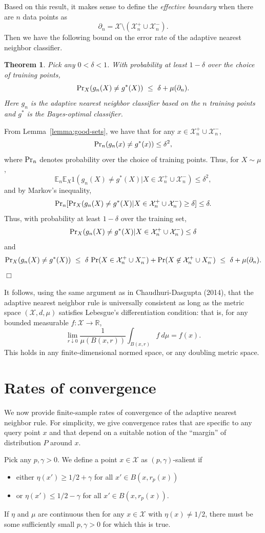 \documentclass{article}
\def\R{{\mathbb{R}}}
\def\pr{{\rm Pr}}
\def\E{{\mathbb E}}
\def\X{{\mathcal X}}
\newtheorem{thm}{Theorem}
\newenvironment{proof}{\noindent {\sc Proof:}}{$\Box$ \medskip}
\begin{document}
Based on this result, it makes sense to define the {\it effective boundary} when there are $n$ data points as 
$$ \partial_n = \X \setminus (\X^+_n \cup \X^-_n) .$$
Then we have the following bound on the error rate of the adaptive nearest neighbor classifier.
\begin{thm}
Pick any $0 < \delta < 1$. With probability at least $1-\delta$ over the choice of training points,
$$ \pr_{X}(g_n(X) \neq g^*(X)) \ \leq \ \delta + \mu(\partial_n) .$$
Here $g_n$ is the adaptive nearest neighbor classifier based on the $n$ training points and $g^*$ is the Bayes-optimal classifier. 
\label{thm:general-error-bound}
\end{thm}
\begin{proof}
From Lemma~\ref{lemma:good-sets}, we have that for any $x \in \X^+_n \cup \X^-_n$, 
$$ \pr_n(g_n(x) \neq g^*(x)) \leq \delta^2 ,$$
where $\pr_n$ denotes probability over the choice of training points. Thus, for $X \sim \mu$,
$$ \E_n \E_X 1(g_n(X) \neq g^*(X) | X \in \X^+_n \cup \X^-_n) \leq \delta^2 ,$$
and by Markov's inequality,
$$ \pr_n [\pr_X (g_n(X) \neq g^*(X) |  X \in \X^+_n \cup \X^-_n) \geq \delta] \leq \delta.$$
Thus, with probability at least $1-\delta$ over the training set,
$$\pr_X (g_n(X) \neq g^*(X) |  X \in \X^+_n \cup \X^-_n) \leq \delta$$
and
$$ \pr_X(g_n(X) \neq g^*(X)) 
\ \leq \ \delta \ \pr(X \in \X^+_n \cup X^-_n) + \pr(X \not\in \X^+_n \cup X^-_n)
\ \leq \ \delta + \mu(\partial_n) .$$
\end{proof}

It follows, using the same argument as in Chaudhuri-Dasgupta (2014), that the adaptive nearest neighbor rule is universally consistent as long as the metric space $(\X, d, \mu)$ satisfies Lebesgue's differentiation condition: that is, for any bounded measurable $f: \X \rightarrow \R$,
$$ \lim_{r \downarrow 0} \frac{1}{\mu(B(x,r))} \int_{B(x,r)} f \ d\mu = f(x) .$$
This holds in any finite-dimensional normed space, or any doubling metric space.

\section{Rates of convergence}

We now provide finite-sample rates of convergence of the adaptive nearest neighbor rule. For simplicity, we give convergence rates that are specific to any query point $x$ and that depend on a suitable notion of the ``margin'' of distribution $P$ around $x$.

Pick any $p, \gamma > 0$. We define a point $x \in \X$ as $(p, \gamma)$-salient if 
\begin{itemize}
\item either $\eta(x') \geq 1/2 + \gamma$ for all $x' \in B(x, r_p(x))$
\item or $\eta(x') \leq 1/2 - \gamma$ for all $x' \in B(x, r_p(x))$.
\end{itemize}
If $\eta$ and $\mu$ are continuous then for any $x \in \X$ with $\eta(x) \neq 1/2$, there must be some sufficiently small $p, \gamma > 0$ for which this is true.
\end{document}
